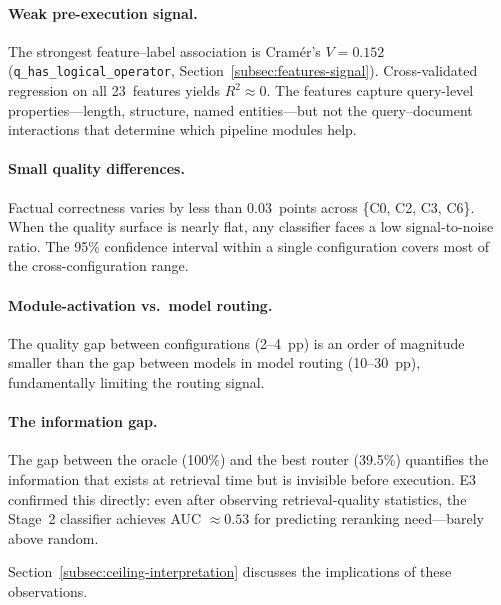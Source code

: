 \paragraph{Weak pre-execution signal.}
The strongest feature--label association is Cramér's $V = 0.152$
(\texttt{q\_has\_logical\_operator}, Section~\ref{subsec:features-signal}).
Cross-validated regression on all 23~features yields
$R^2 \approx 0$.  The features capture query-level properties---length,
structure, named entities---but not the query--document interactions that
determine which pipeline modules help.

\paragraph{Small quality differences.}
Factual correctness varies by less than 0.03~points across
\{C0, C2, C3, C6\}.  When the quality surface is nearly flat, any
classifier faces a low signal-to-noise ratio.  The 95\% confidence interval
within a single configuration covers most of the cross-configuration range.

\paragraph{Module-activation vs.\ model routing.}
The quality gap between configurations (2--4~pp) is an order of magnitude
smaller than the gap between models in model routing (10--30~pp),
fundamentally limiting the routing signal.

\paragraph{The information gap.}
The gap between the oracle (100\%) and the best router (39.5\%) quantifies
the information that exists at retrieval time but is invisible before
execution.  E3 confirmed this directly: even after observing
retrieval-quality statistics, the Stage~2 classifier achieves
AUC $\approx 0.53$ for predicting reranking need---barely above random.

Section~\ref{subsec:ceiling-interpretation} discusses the implications of
these observations.





